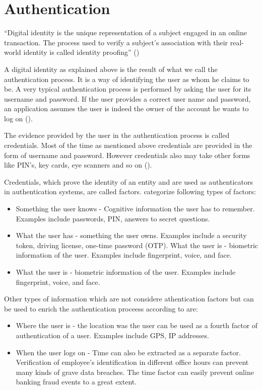 	

  

\section{Authentication}

“Digital identity is the unique representation of a subject engaged in an online transaction. The process used to verify a subject’s association with their real-world identity is called identity proofing” (\citet{NIST:2017:DIG})

A digital identity as explained above is the result of what we call the authentication process. It is a way of identifying the user as whom he claims to be. A very typical authentication process is performed by asking the user for its username and password. If the user provides a correct user name and password, an application assumes the user is indeed the owner of the account he wants to log on (\citet{Boyed:2012:GSOA}). 

The evidence provided by the user in the authentication process is called credentials. Most of the time as mentioned above credentials are provided in the form of username and password. However credentials also may take other forms like PIN’s, key cards, eye scanners and so on (\citet{Todorov:2007:MUI}). 

Credentials, which prove the identity of an entity and are used as authenticators in authentication systems, are called factors. \citet{NIST:2017:DIG} categorize following types of factors:

\begin{itemize}  
\item Something the user knows - Cognitive information the user has to remember. Examples include passwords, PIN, answers to secret questions.
\item What the user has - something the user owns. Examples include a security token, driving license, one-time password (OTP). 
What the user is - biometric information of the user. Examples include fingerprint, voice, and face.  
\item What the user is - biometric information of the user. Examples include fingerprint, voice, and face. 
\end{itemize}

 Other types of information which are not considere athentication factors but  can be used to enrich the authentication proceess according to \citet{Dasgupta:2017:AUA} are:
 
 \begin{itemize}
 	\item Where the user is - the location was the user can be used as a fourth factor of authentication of a user. Examples include GPS, IP addresses.
 	\item When the user logs on - Time can also be extracted as a separate factor. Verification of employee’s identification in different office hours can prevent many kinds of grave data breaches. The time factor can easily prevent online banking fraud events to a great extent. 
 \end{itemize}




